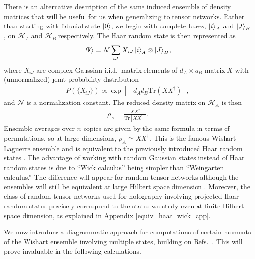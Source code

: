 \documentclass[a4paper,11pt]{article}
\newcommand{\Tr}{\text{Tr}}
\newcommand*{\SR}[1]{\textcolor{magenta}{[SR: \textsf{#1}]}}
\begin{document}
There is an alternative description of the same induced ensemble of density matrices that will be useful for us when generalizing to tensor networks. Rather than starting with fiducial state $\ket{0}$, we begin with complete bases, 
$\ket{i}_A$ and $\ket{J}_B$, 
on $\mathcal{H}_A$ and $\mathcal{H}_B$ respectively. The Haar random state is then represented as
\begin{align}
    \ket{\Psi } = \mathcal{N}\sum_{iJ}X_{iJ}\ket{i}_A\otimes \ket{J}_B,
\end{align}
where $X_{iJ}$ are complex Gaussian i.i.d.~matrix elements of $d_A \times d_B$ matrix $X$ with (unnormalized) joint probability distribution
\begin{align}
    P(\{ X_{iJ}\}) \propto \exp\left[-d_Ad_B \Tr \left(X X^{\dagger}\right)\right],
\end{align}
and $\mathcal{N}$ is a normalization constant. The reduced density matrix on $\mathcal{H}_A$ is then \cite{2001JPhA...34.7111Z,2004JPhA...37.8457S,2011JMP....52f2201Z}
\begin{align}
    \rho_A = \frac{X X^{\dagger}}{\Tr\left[X X^{\dagger} \right]}.
\end{align}
Ensemble averages over $n$ copies are given by the same formula in terms of permutations, so at large dimensions, $\rho_A \simeq X X^{\dagger}$. This is the famous Wishart-Laguerre ensemble and is equivalent to the previously introduced Haar random states \cite{2007AnHP....8.1521N,2009arXiv0910.1768C}. The advantage of working with random Gaussian states instead of Haar random states is due to ``Wick calculus'' being simpler than ``Weingarten calculus.'' The difference will appear for random tensor networks although the ensembles will still be equivalent at large Hilbert space dimension \cite{2010JPhA...43A5303C}. Moreover, the class of random tensor networks used for holography involving projected Haar random states \cite{2016JHEP...11..009H} precisely correspond to the states we study even at finite Hilbert space dimension, as explained in Appendix \ref{equiv_haar_wick_app}.

We now introduce a diagrammatic approach for computations of certain moments of the Wishart ensemble involving multiple states, building on Refs.~\cite{1995NuPhB.453..531B,2008AcPPB..39..799J,2020arXiv201101277S,2021PhRvL.126q1603K}. This will prove invaluable in the following calculations.
\end{document}
